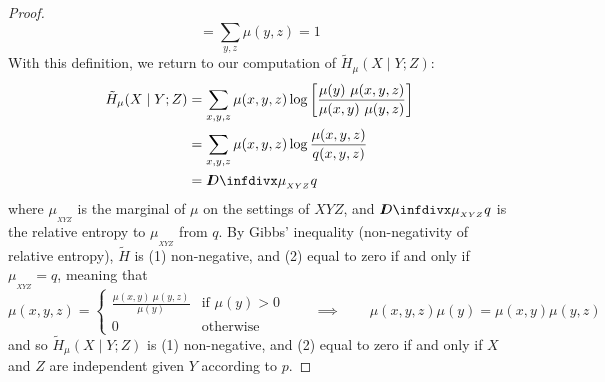 \documentclass{article}
\numberwithin{equation}{section}
\begin{document}
\begin{proof}
\[	= \sum_{y,z}  \mu(y,z)
	= 1
	\]	
	With this definition, we return to our computation of $\tilde H_\mu(X \mid Y; Z)$:
	\begin{align*}
		\tilde H_\mu(X \mid Y; Z) &= \sum_{x,y, z}  \mu(x,y ,z) \log \left[\frac{\mu(y)\ \mu(x,y,z)}{\mu(x,y)\ \mu(y,z)} \right]  \\ %
		&= \sum_{x,y, z}  \mu(x,y ,z) \log \frac{\mu(x,y,z)}{q(x,y,z)}  \\
		&= \kldiv{\mu_{_{XYZ}}}{q}
	\end{align*}
	where $\mu_{_{XYZ}}$ is the marginal of $\mu$ on the settings of $XYZ$, and $\kldiv{\mu_{_{XYZ}}}{q}$ is the relative entropy to $\mu_{_{XYZ}}$ from $q$. By Gibbs' inequality (non-negativity of relative entropy), $\tilde H$ is  (1) non-negative, and (2) equal to zero if and only if $\mu_{_{XYZ}} = q$, meaning that 
	\[  \mu(x,y,z) =\begin{cases} \frac{\mu(x,y)\ \mu(y,z)}{\mu(y)} & \text{if }\mu(y) > 0\\ 0 & \text{otherwise} \end{cases} \qquad \implies \qquad \mu(x,y,z) \mu(y) = \mu(x,y) \mu(y, z) \] 
	and so $\tilde H_\mu(X \mid Y; Z)$ is (1) non-negative, and (2) equal to zero if and only if $X$ and $Z$ are independent given $Y$ according to $p$.
\end{proof}
\end{document}

